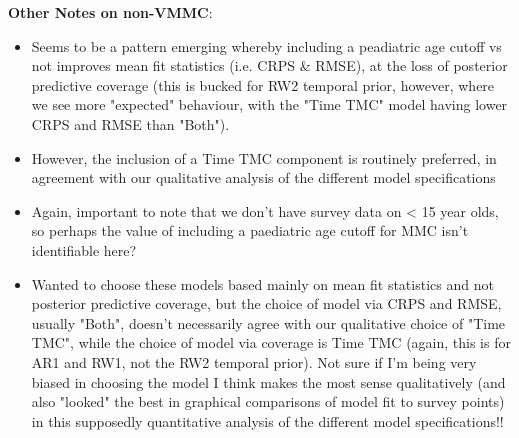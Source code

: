 \documentclass{article}
\begin{document}
\textbf{Other Notes on non-VMMC}:
\begin{itemize}
    \item Seems to be a pattern emerging whereby including a peadiatric age cutoff vs not improves mean fit statistics (i.e. CRPS \& RMSE), at the loss of posterior predictive coverage (this is bucked for RW2 temporal prior, however, where we see more "expected" behaviour, with the "Time TMC" model having lower CRPS and RMSE than "Both"). 
    \item However, the inclusion of a Time TMC component is routinely preferred, in agreement with our qualitative analysis of the different model specifications 
    \item Again, important to note that we don't have survey data on < 15 year olds, so perhaps the value of including a paediatric age cutoff for MMC isn't identifiable here?
    \item Wanted to choose these models based mainly on mean fit statistics and not posterior predictive coverage, but the choice of model via CRPS and RMSE, usually "Both", doesn't necessarily agree with our qualitative choice of "Time TMC", while the choice of model via coverage is Time TMC (again, this is for AR1 and RW1, not the RW2 temporal prior). Not sure if I'm being very biased in choosing the model I think makes the most sense qualitatively (and also "looked" the best in graphical comparisons of model fit to survey points) in this supposedly quantitative analysis of the different model specifications!!

\end{itemize}



\end{document}
